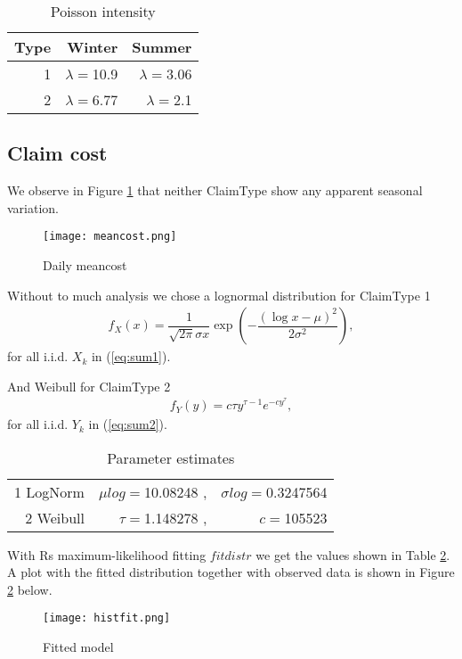 \documentclass[11pt]{article}
\begin{document}
\begin{table}[h]
\center
\begin{tabular}{r|rr}
Type & Winter & Summer \\ 
\hline
1 & $\lambda=$10.9 & $\lambda=$3.06 \\
2 & $\lambda=$6.77 & $\lambda=$2.1\\
\hline
\end{tabular}
\caption{Poisson intensity} \label{tab:lambda}
\end{table}


\subsection*{Claim cost}
We observe in Figure \ref{fig:samplefig2} that neither ClaimType show any apparent seasonal variation.
 \begin{figure}[h]
 \center
  \texttt{[image: meancost.png]}
  \caption{Daily meancost}
  \label{fig:samplefig2}
\end{figure}

Without to much analysis we chose a lognormal distribution for
ClaimType 1
\begin{align*}
	f_{X}(x) = \dfrac{1}{\sqrt{2\pi}\sigma x} \exp\left(-\dfrac{(\log x - \mu)^2}{2\sigma^2}\right) , 
\end{align*}
for all i.i.d. $X_k$ in (\ref{eq:sum1}).

And Weibull for
ClaimType 2
\begin{align*}
	f_{Y}(y) = c \tau y^{\tau - 1}e^{-cy^\tau} , 
\end{align*}
for all i.i.d. $Y_k$ in (\ref{eq:sum2}).


\begin{table}[h]
\center
\begin{tabular}{|r|rr|}
\hline
1 LogNorm & $\mu log=$10.08248 ,& $\sigma log=$0.3247564 \\
2 Weibull & $\tau=$1.148278 ,& $c=$105523\\
\hline
\end{tabular}
\caption{Parameter estimates} \label{tab:cost}
\end{table}

With Rs maximum-likelihood fitting $fitdistr$ we get the values shown in Table \ref{tab:cost}. A plot with the fitted distribution together with
observed data is shown in Figure \ref{fig:xxx} below.
 \begin{figure}[H]
 \center
  \texttt{[image: histfit.png]}
 \caption{Fitted model}
  \label{fig:xxx}
\end{figure}
\end{document}
